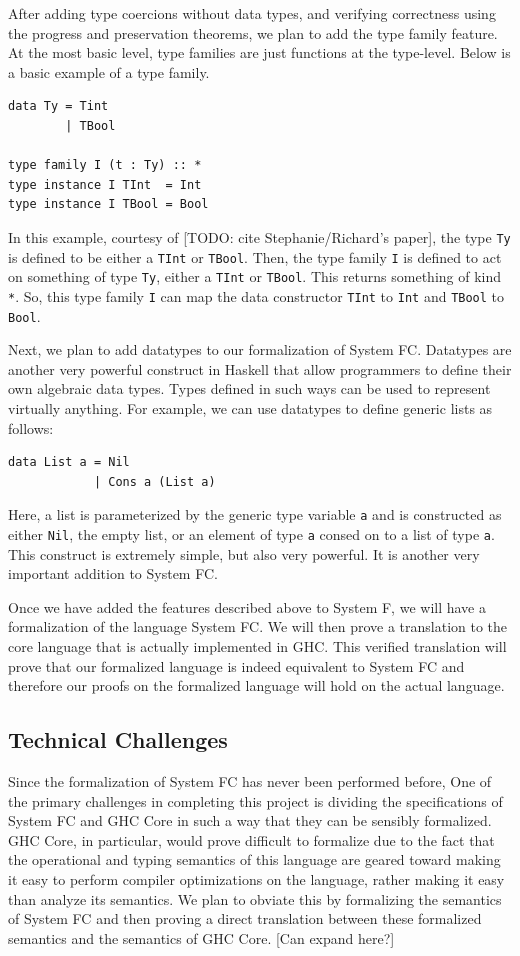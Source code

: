 \documentclass{sig-alternate}
\begin{document}
After adding type coercions without data types, and verifying correctness using the progress and preservation theorems, we plan to add the type family feature. At the most basic level, type families are just functions at the type-level. Below is a basic example of a type family.
\begin{verbatim}
data Ty = Tint
        | TBool

type family I (t : Ty) :: *
type instance I TInt  = Int
type instance I TBool = Bool
\end{verbatim}
In this example, courtesy of [TODO: cite Stephanie/Richard’s paper], the type \texttt{Ty} is defined to be either a \texttt{TInt} or \texttt{TBool}. Then, the type family \texttt{I} is defined to act on something of type \texttt{Ty}, either a \texttt{TInt} or \texttt{TBool}. This returns something of kind \texttt{*}. So, this type family \texttt{I} can map the data constructor \texttt{TInt} to \texttt{Int} and \texttt{TBool} to \texttt{Bool}.

Next, we plan to add datatypes to our formalization of System FC.  Datatypes are another very powerful construct in Haskell that allow programmers to define their own algebraic data types.  Types defined in such ways can be used to represent virtually anything.  For example, we can use datatypes to define generic lists as follows:
\begin{verbatim}
data List a = Nil
            | Cons a (List a)
\end{verbatim}
Here, a list is parameterized by the generic type variable \texttt{a} and is constructed as either \texttt{Nil}, the empty list, or an element of type \texttt{a} consed on to a list of type \texttt{a}.  This construct is extremely simple, but also very powerful.  It is another very important addition to System FC.

Once we have added the features described above to System F, we will have a formalization of the language System FC.  We will then prove a translation to the core language that is actually implemented in GHC.  This verified translation will prove that our formalized language is indeed equivalent to System FC and therefore our proofs on the formalized language will hold on the actual language.

\subsection{Technical Challenges}
\label{subsec:tech_challenges}
Since the formalization of System FC has never been performed before, 
One of the primary challenges in completing this project is dividing the specifications of System FC and GHC Core in such a way that they can be sensibly formalized. GHC Core, in particular, would prove difficult to formalize due to the fact that the operational and typing semantics of this language are geared toward making it easy to perform compiler optimizations on the language, rather making it easy than analyze its semantics. We plan to obviate this by formalizing the semantics of System FC and then proving a direct translation between these formalized semantics and the semantics of GHC Core. [Can expand here?]
\end{document}
